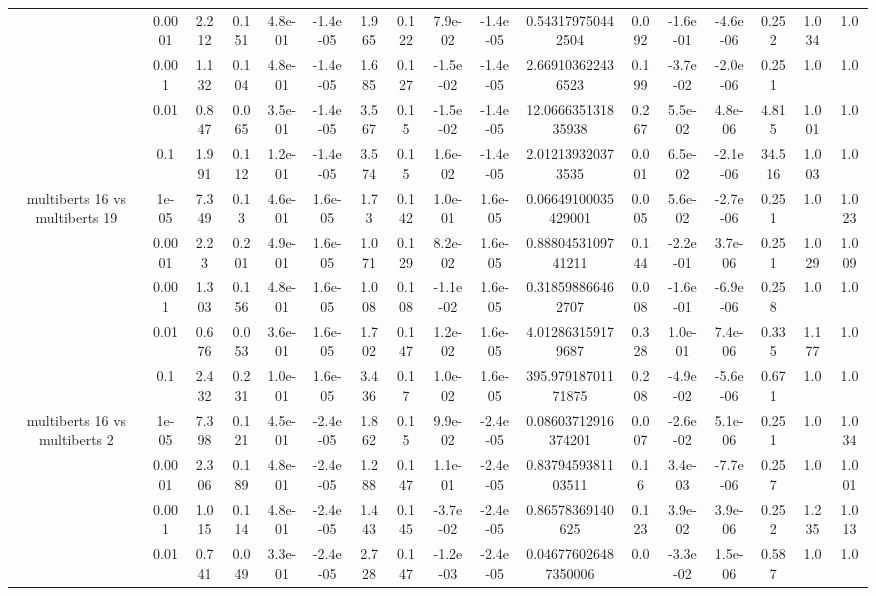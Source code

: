 \begin{tabular}{|c|c|c|c|c|c|c|c|c|c|c|c|c|c|c|c|c|}
 & 0.0001 & 2.212 & 0.151 & 4.8e-01 & -1.4e-05 & 1.965 & 0.122 & 7.9e-02 & -1.4e-05 & 0.543179750442504 & 0.092 & -1.6e-01 & -4.6e-06 & 0.252 & 1.034 & 1.0 \\
 & 0.001 & 1.132 & 0.104 & 4.8e-01 & -1.4e-05 & 1.685 & 0.127 & -1.5e-02 & -1.4e-05 & 2.669103622436523 & 0.199 & -3.7e-02 & -2.0e-06 & 0.251 & 1.0 & 1.0 \\
 & 0.01 & 0.847 & 0.065 & 3.5e-01 & -1.4e-05 & 3.567 & 0.15 & -1.5e-02 & -1.4e-05 & 12.066635131835938 & 0.267 & 5.5e-02 & 4.8e-06 & 4.815 & 1.001 & 1.0 \\
 & 0.1 & 1.991 & 0.112 & 1.2e-01 & -1.4e-05 & 3.574 & 0.15 & 1.6e-02 & -1.4e-05 & 2.012139320373535 & 0.001 & 6.5e-02 & -2.1e-06 & 34.516 & 1.003 & 1.0 \\
\hline
\multirow{5}{*}{multiberts 16 vs multiberts 19} & 1e-05 & 7.349 & 0.13 & 4.6e-01 & 1.6e-05 & 1.73 & 0.142 & 1.0e-01 & 1.6e-05 & 0.06649100035429001 & 0.005 & 5.6e-02 & -2.7e-06 & 0.251 & 1.0 & 1.023 \\
 & 0.0001 & 2.23 & 0.201 & 4.9e-01 & 1.6e-05 & 1.071 & 0.129 & 8.2e-02 & 1.6e-05 & 0.8880453109741211 & 0.144 & -2.2e-01 & 3.7e-06 & 0.251 & 1.029 & 1.009 \\
 & 0.001 & 1.303 & 0.156 & 4.8e-01 & 1.6e-05 & 1.008 & 0.108 & -1.1e-02 & 1.6e-05 & 0.318598866462707 & 0.008 & -1.6e-01 & -6.9e-06 & 0.258 & 1.0 & 1.0 \\
 & 0.01 & 0.676 & 0.053 & 3.6e-01 & 1.6e-05 & 1.702 & 0.147 & 1.2e-02 & 1.6e-05 & 4.012863159179687 & 0.328 & 1.0e-01 & 7.4e-06 & 0.335 & 1.177 & 1.0 \\
 & 0.1 & 2.432 & 0.231 & 1.0e-01 & 1.6e-05 & 3.436 & 0.17 & 1.0e-02 & 1.6e-05 & 395.97918701171875 & 0.208 & -4.9e-02 & -5.6e-06 & 0.671 & 1.0 & 1.0 \\
\hline
\multirow{5}{*}{multiberts 16 vs multiberts 2} & 1e-05 & 7.398 & 0.121 & 4.5e-01 & -2.4e-05 & 1.862 & 0.15 & 9.9e-02 & -2.4e-05 & 0.08603712916374201 & 0.007 & -2.6e-02 & 5.1e-06 & 0.251 & 1.0 & 1.034 \\
 & 0.0001 & 2.306 & 0.189 & 4.8e-01 & -2.4e-05 & 1.288 & 0.147 & 1.1e-01 & -2.4e-05 & 0.8379459381103511 & 0.16 & 3.4e-03 & -7.7e-06 & 0.257 & 1.0 & 1.001 \\
 & 0.001 & 1.015 & 0.114 & 4.8e-01 & -2.4e-05 & 1.443 & 0.145 & -3.7e-02 & -2.4e-05 & 0.86578369140625 & 0.123 & 3.9e-02 & 3.9e-06 & 0.252 & 1.235 & 1.013 \\
 & 0.01 & 0.741 & 0.049 & 3.3e-01 & -2.4e-05 & 2.728 & 0.147 & -1.2e-03 & -2.4e-05 & 0.046776026487350006 & 0.0 & -3.3e-02 & 1.5e-06 & 0.587 & 1.0 & 1.0 \\

\end{tabular}
